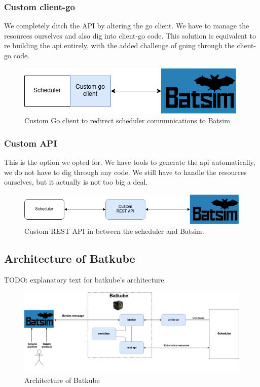 \subsubsection{Custom client-go}

We completely ditch the API by altering the go client. We have to manage the
resources ourselves and also dig into client-go code. This solution is
equivalent to re building the api entirely, with the added challenge of going
through the client-go code.

\begin{figure}[h]
	\centering
	\includegraphics{imgs/custom-go-client.png}
	\caption{Custom Go client to redirect scheduler communications to Batsim}
	\label{fig:custom-go-client}
\end{figure}

\subsubsection{Custom API}

This is the option we opted for. We have tools to generate the api
automatically, we do not have to dig through any code. We still have to handle
the resources ourselves, but it actually is not too big a deal.

\begin{figure}[h]
	\centering
	\includegraphics[width=\textwidth]{imgs/custom-restapi.png}
	\caption{Custom REST API in between the scheduler and Batsim.}
	\label{fig:custom-api}
\end{figure}

\subsection{Architecture of Batkube}

TODO: explanatory text for batkube's architecture.

\begin{figure}[h]
	\centering
	\includegraphics[width=\textwidth]{imgs/batkube-architecture-3-synchro.png}
	\caption{Architecture of Batkube}
	\label{fig:batkube-architecture}
\end{figure}

